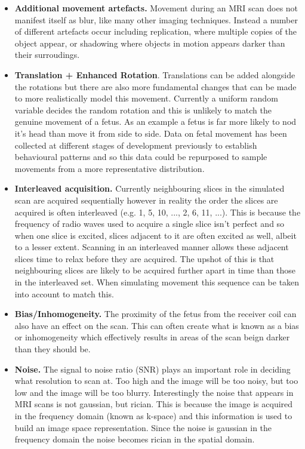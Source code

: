 \begin{itemize}
  \item \textbf{Additional movement artefacts.} Movement during an MRI scan does not manifest itself as blur, like many other imaging techniques. Instead a number of different artefacts occur including replication, where multiple copies of the object appear, or shadowing where objects in motion appears darker than their surroudings.

  \item \textbf{Translation + Enhanced Rotation}. Translations can be added alongside the rotations but there are also more fundamental changes that can be made to more realistically model this movement. Currently a uniform random variable decides the random rotation and this is unlikely to match the genuine movement of a fetus. As an example a fetus is far more likely to nod it's head than move it from side to side. Data on fetal movement has been collected at different stages of development previously to establish behavioural patterns\cite{fetalmovement} and so this data could be repurposed to sample movements from a more representative distribution.

  \item \textbf{Interleaved acquisition.} Currently neighbouring slices in the simulated scan are acquired sequentially however in reality the order the slices are acquired is often interleaved (e.g. 1, 5, 10, ..., 2, 6, 11, ...). This is because the frequency of radio waves used to acquire a single slice isn't perfect and so when one slice is excited, slices adjacent to it are often excited as well, albeit to a lesser extent\cite{basicsofmri}. Scanning in an interleaved manner allows these adjacent slices time to relax before they are acquired. The upshot of this is that neighbouring slices are likely to be acquired further apart in time than those in the interleaved set. When simulating movement this sequence can be taken into account to match this.

  \item \textbf{Bias/Inhomogeneity.} The proximity of the fetus from the receiver coil can also have an effect on the scan. This can often create what is known as a bias or inhomogeneity which effectively results in areas of the scan beign darker than they should be.

  \item \textbf{Noise.} The signal to noise ratio (SNR) plays an important role in deciding what resolution to scan at. Too high and the image will be too noisy, but too low and the image will be too blurry. Interestingly the noise that appears in MRI scans is not gaussian, but rician. This is because the image is acquired in the frequency domain (known as k-space) and this information is used to build an image space representation. Since the noise is gaussian in the frequency domain the noise becomes rician in the spatial domain.
  

\end{itemize}
